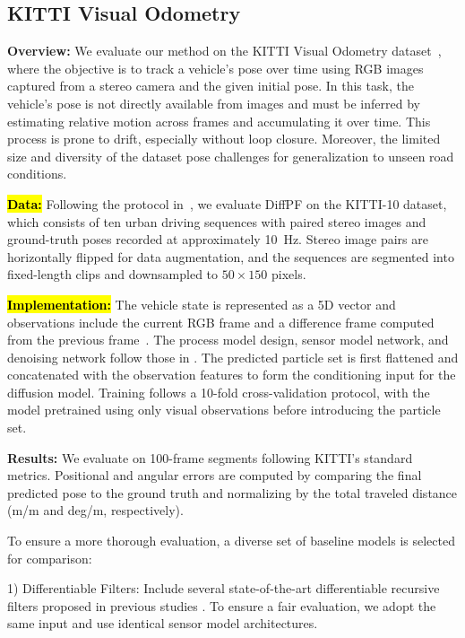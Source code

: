 \subsection{KITTI Visual Odometry}
\textbf{Overview:} 
We evaluate our method on the KITTI Visual Odometry dataset~\cite{geiger2013vision}, where the objective is to track a vehicle's pose over time using RGB images captured from a stereo camera and the given initial pose. In this task, the vehicle's pose is not directly available from images and must be inferred by estimating relative motion across frames and accumulating it over time. This process is prone to drift, especially without loop closure. Moreover, the limited size and diversity of the dataset pose challenges for generalization to unseen road conditions.

\textbf{\hl{Data:}}
Following the protocol in~\cite{kloss2021train, wan2025dnd}, we evaluate DiffPF on the KITTI-10 dataset, which consists of ten urban driving sequences with paired stereo images and ground-truth poses recorded at approximately 10~Hz. Stereo image pairs are horizontally flipped for data augmentation, and the sequences are segmented into fixed-length clips and downsampled to $50 \times 150$ pixels.

\textbf{\hl{Implementation:}} 
The vehicle state is represented as a 5D vector and observations include the current RGB frame and a difference frame computed from the previous frame~\cite{kloss2021train, haarnoja2016backprop}.
The process model design, sensor model network, and denoising network follow those in
\cite{wan2025dnd}. The predicted particle set is first flattened and concatenated with the observation features to form the conditioning input for the diffusion model. Training follows a 10-fold cross-validation protocol, with the model pretrained using only visual observations before introducing the particle set.

\textbf{Results:} 
We evaluate on 100-frame segments following KITTI’s standard metrics. Positional and angular errors are computed by comparing the final predicted pose to the ground truth and normalizing by the total traveled distance (m/m and deg/m, respectively).

To ensure a more thorough evaluation, a diverse set of baseline models is selected for comparison:

    1) Differentiable Filters: Include several state-of-the-art differentiable recursive filters proposed in previous studies \cite{kloss2021train, haarnoja2016backprop, wan2025dnd}. To ensure a fair evaluation, we adopt the same input and use identical sensor model architectures.

